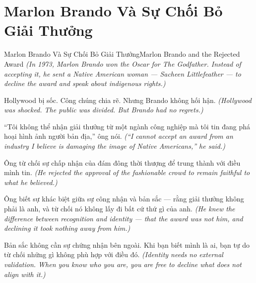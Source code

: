 \section{Marlon Brando Và Sự Chối Bỏ Giải Thưởng}
\begin{truyen}{Marlon Brando Và Sự Chối Bỏ Giải Thưởng}{Marlon Brando and the Rejected Award}
\textit{(In 1973, Marlon Brando won the Oscar for The Godfather. Instead of accepting it, he sent a Native American woman — Sacheen Littlefeather — to decline the award and speak about indigenous rights.)}

Hollywood bị sốc. Công chúng chia rẽ. Nhưng Brando không hối hận.
\textit{(Hollywood was shocked. The public was divided. But Brando had no regrets.)}

``Tôi không thể nhận giải thưởng từ một ngành công nghiệp mà tôi tin đang phá hoại hình ảnh người bản địa,'' ông nói.
\textit{(``I cannot accept an award from an industry I believe is damaging the image of Native Americans,'' he said.)}

Ông từ chối sự chấp nhận của đám đông thời thượng để trung thành với điều mình tin.
\textit{(He rejected the approval of the fashionable crowd to remain faithful to what he believed.)}

Ông biết sự khác biệt giữa sự công nhận và bản sắc — rằng giải thưởng không phải là anh, và từ chối nó không lấy đi bất cứ thứ gì của anh.
\textit{(He knew the difference between recognition and identity — that the award was not him, and declining it took nothing away from him.)}

\end{truyen}

\begin{baihoc}
Bản sắc không cần sự chứng nhận bên ngoài. Khi bạn biết mình là ai, bạn tự do từ chối những gì không phù hợp với điều đó.
\textit{(Identity needs no external validation. When you know who you are, you are free to decline what does not align with it.)}
\end{baihoc}
\ngancach

